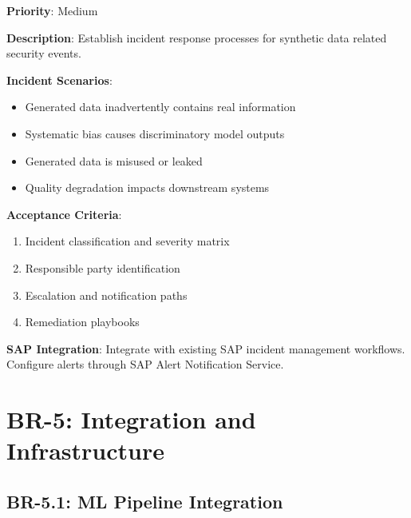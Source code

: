 \begin{tcolorbox}[colback=red!5,colframe=red!70,title=BR-4.5: Incident Response Process]
\textbf{Priority}: Medium

\textbf{Description}: Establish incident response processes for synthetic data
related security events.

\textbf{Incident Scenarios}:
\begin{itemize}
  \item Generated data inadvertently contains real information
  \item Systematic bias causes discriminatory model outputs
  \item Generated data is misused or leaked
  \item Quality degradation impacts downstream systems
\end{itemize}

\textbf{Acceptance Criteria}:
\begin{enumerate}
  \item Incident classification and severity matrix
  \item Responsible party identification
  \item Escalation and notification paths
  \item Remediation playbooks
\end{enumerate}

\textbf{SAP Integration}: Integrate with existing SAP incident management workflows.
Configure alerts through SAP Alert Notification Service.
\end{tcolorbox}


\section{BR-5: Integration and Infrastructure}

\subsection{BR-5.1: ML Pipeline Integration}

